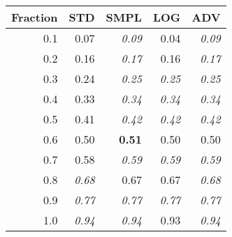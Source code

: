 \documentclass{standalone}
\begin{document}
\begin{tabular}{r|rrrr}
      \toprule
      Fraction & STD & SMPL & LOG & ADV\\
      \midrule
      0.1 & 0.07 & \emph{0.09} & 0.04 & \emph{0.09}\\
  0.2 & 0.16 & \emph{0.17} & 0.16 & \emph{0.17}\\
  0.3 & 0.24 & \emph{0.25} & \emph{0.25} & \emph{0.25}\\
  0.4 & 0.33 & \emph{0.34} & \emph{0.34} & \emph{0.34}\\
  0.5 & 0.41 & \emph{0.42} & \emph{0.42} & \emph{0.42}\\
  0.6 & 0.50 & \textbf{0.51} & 0.50 & 0.50\\
  0.7 & 0.58 & \emph{0.59} & \emph{0.59} & \emph{0.59}\\
  0.8 & \emph{0.68} & 0.67 & 0.67 & \emph{0.68}\\
  0.9 & \emph{0.77} & \emph{0.77} & \emph{0.77} & \emph{0.77}\\
  1.0 & \emph{0.94} & \emph{0.94} & 0.93 & \emph{0.94}\\
  \bottomrule
\end{tabular}
\end{document}

